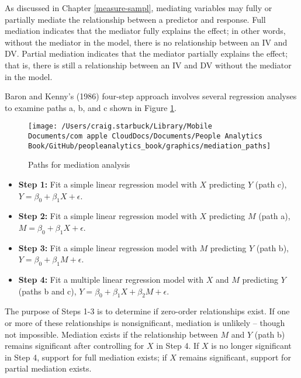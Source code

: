 \documentclass[
]{book}
\providecommand{\tightlist}{%
  \setlength{\itemsep}{0pt}\setlength{\parskip}{0pt}}
\begin{document}
As discussed in Chapter \ref{measure-sampl}, mediating variables may fully or partially mediate the relationship between a predictor and response. Full mediation indicates that the mediator fully explains the effect; in other words, without the mediator in the model, there is no relationship between an IV and DV. Partial mediation indicates that the mediator partially explains the effect; that is, there is still a relationship between an IV and DV without the mediator in the model.

Baron and Kenny's (1986) four-step approach involves several regression analyses to examine paths a, b, and c shown in Figure \ref{fig:med-paths}.

\begin{figure}

{\centering \texttt{[image: /Users/craig.starbuck/Library/Mobile Documents/com~apple~CloudDocs/Documents/People Analytics Book/GitHub/peopleanalytics\_book/graphics/mediation\_paths]} 

}

\caption{Paths for mediation analysis}\label{fig:med-paths}
\end{figure}

\begin{itemize}
\tightlist
\item
  \textbf{Step 1:} Fit a simple linear regression model with \(X\) predicting \(Y\) (path c), \(Y = \beta_0 + \beta_1 X + \epsilon\).
\item
  \textbf{Step 2:} Fit a simple linear regression model with \(X\) predicting \(M\) (path a), \(M = \beta_0 + \beta_1 X + \epsilon\).
\item
  \textbf{Step 3:} Fit a simple linear regression model with \(M\) predicting \(Y\) (path b), \(Y = \beta_0 + \beta_1 M + \epsilon\).
\item
  \textbf{Step 4:} Fit a multiple linear regression model with \(X\) and \(M\) predicting \(Y\) (paths b and c), \(Y = \beta_0 + \beta_1 X + \beta_2 M + \epsilon\).
\end{itemize}

The purpose of Steps 1-3 is to determine if zero-order relationships exist. If one or more of these relationships is nonsignificant, mediation is unlikely -- though not impossible. Mediation exists if the relationship between \(M\) and \(Y\) (path b) remains significant after controlling for \(X\) in Step 4. If \(X\) is no longer significant in Step 4, support for full mediation exists; if \(X\) remains significant, support for partial mediation exists.
\end{document}
